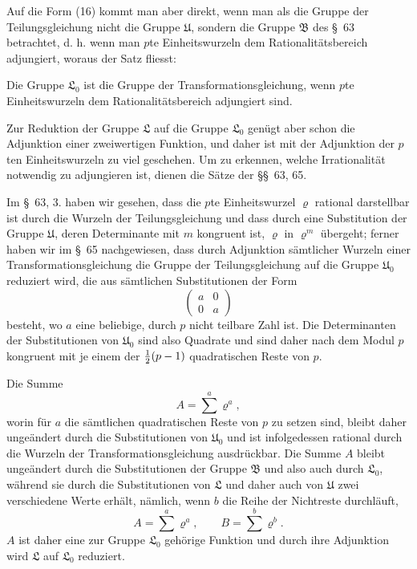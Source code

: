\documentclass[11pt]{article}
\begin{document}
Auf die Form (16) kommt man aber direkt, wenn man als die Gruppe der Teilungsgleichung nicht die Gruppe $\mathfrak U$, sondern die Gruppe $\mathfrak B$ des \S~63 betrachtet, d. h. wenn man $p$te Einheitswurzeln dem Rationalitätsbereich adjungiert, woraus der Satz fliesst:

Die Gruppe $\mathfrak L_0$ ist die Gruppe der Transformationsgleichung, wenn $p$te Einheitswurzeln dem Rationalitätsbereich adjungiert sind.

Zur Reduktion der Gruppe $\mathfrak L$ auf die Gruppe $\mathfrak L_0$ genügt aber schon die Adjunktion einer zweiwertigen Funktion, und daher ist mit der Adjunktion der $p$ten Einheitswurzeln zu viel geschehen. Um zu erkennen, welche Irrationalität notwendig zu adjungieren ist, dienen die Sätze der \S\S~63, 65.

Im \S~63, 3. haben wir gesehen, dass die $p$te Einheitswurzel $\varrho$ rational darstellbar ist durch die Wurzeln der Teilungsgleichung und dass durch eine Substitution der Gruppe $\mathfrak U$, deren Determinante mit $m$ kongruent ist, $\varrho$ in $\varrho^m$ übergeht; ferner haben wir im \S~65 nachgewiesen, dass durch Adjunktion sämtlicher Wurzeln einer Transformationsgleichung die Gruppe der Teilungsgleichung auf die Gruppe $\mathfrak U_0$ reduziert wird, die aus sämtlichen Substitutionen der Form
\begin{equation}
\begin{pmatrix}a&0\\0&a\end{pmatrix}
\tag{18}
\end{equation}
besteht, wo $a$ eine beliebige, durch $p$ nicht teilbare Zahl ist. Die Determinanten der Substitutionen von $\mathfrak U_0$ sind also Quadrate und sind daher nach dem Modul $p$ kongruent mit je einem der ${1\over2}(p-1)$ quadratischen Reste von $p$.

Die Summe
\begin{equation}
 A=\sum^a \varrho^a,
\tag{19}
\end{equation}
worin für $a$ die sämtlichen quadratischen Reste von $p$ zu setzen sind, bleibt daher ungeändert durch die Substitutionen von $\mathfrak U_0$ und ist infolgedessen rational durch die Wurzeln der Transformationsgleichung ausdrückbar. Die Summe $A$ bleibt ungeändert durch die Substitutionen der Gruppe $\mathfrak B$ und also auch durch $\mathfrak L_0$, während sie durch die Substitutionen von $\mathfrak L$ und daher auch von $\mathfrak U$ zwei verschiedene Werte erhält, nämlich, wenn $b$ die Reihe der Nichtreste durchläuft,
\[
 A=\sum^a\varrho^a,
 \qquad
 B=\sum^b\varrho^b.
\]
$A$ ist daher eine zur Gruppe $\mathfrak L_0$ gehörige Funktion und durch ihre Adjunktion wird $\mathfrak L$ auf $\mathfrak L_0$ reduziert.
\end{document}
